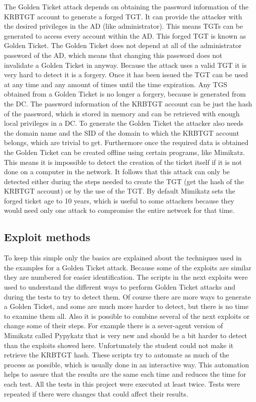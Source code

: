 \linej
The Golden Ticket attack depends on obtaining the password information of the KRBTGT account to generate a forged TGT. It can provide the attacker with the desired privileges in the AD (like administrator).
\linej
This means TGTs can be generated to access every account within the AD. This forged TGT is known as Golden Ticket.
The Golden Ticket does not depend at all of the administrator password of the AD, which means that changing this password does not invalidate a Golden Ticket in anyway.
\linej
\linej
Because the attack uses a valid TGT it is very hard to detect it is a forgery. Once it has been issued the TGT can be used at any time and any amount of times until the time expiration.
Any TGS obtained from a Golden Ticket is no longer a forgery, because is generated from the DC.
\linej
\linej
The password information of the KRBTGT account can be just the hash of the password, which is stored in memory and can be retrieved with enough local privileges in a DC. To generate the Golden Ticket the attacker also needs the domain name and the SID of the domain to which the KRBTGT account belongs, which are trivial to get\cite{stealthbits}.
\linej
Furthermore once the required data is obtained the Golden Ticket can be created offline using certain programs, like Mimikatz. This means it is impossible to detect the creation of the ticket itself if it is not done on a computer in the network.
\linej
It follows that this attack can only be detected either during the steps needed to create the TGT (get the hash of the KRBTGT account) or by the use of the TGT.
\linej
\linej
By default Mimikatz sets the forged ticket age to 10 years, which is useful to some attackers because they would need only one attack to compromise the entire network for that time.

\subsection{Exploit methods}
To keep this simple only the basics are explained about the techniques used in the examples for a Golden Ticket attack. Because some of the exploits are similar they are numbered for easier identification. The scripts in the next exploits were used to understand the different ways to perform Golden Ticket attacks and during the tests to try to detect them. Of course there are more ways to generate a Golden Ticket, and some are much more harder to detect, but there is no time to examine them all. Also it is possible to combine several of the next exploits or change some of their steps.
\linej
For example there is a sever-agent version of Mimikatz called Pypykatz\cite{pypykatz_agent}\cite{pypykatz_server} that is very new and should be a bit harder to detect than the exploits showed here. Unfortunately the student could not make it retrieve the KRBTGT hash.
\linej
\linej
These scripts try to automate as much of the process as possible, which is usually done in an interactive way. This automation helps to assure that the results are the same each time and reduces the time for each test. All the tests in this project were executed at least twice. Tests were repeated if there were changes that could affect their results.

